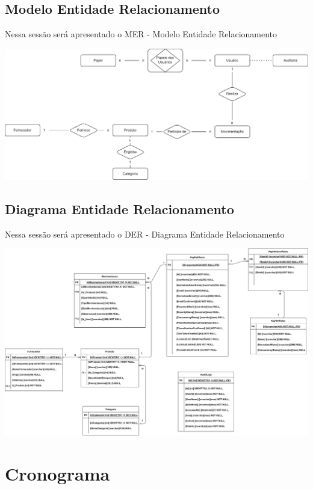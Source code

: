 \documentclass[
	12pt,				%
	openany,			%
	twoside,			%
	a4paper,			%
	english,			%
	brazil				%
	]{abntex2}
\begin{document}
\subsection{Modelo Entidade Relacionamento}
Nessa sessão será apresentado o MER - Modelo Entidade Relacionamento

\includegraphics[width=1.0\textwidth]{Figuras/MERestoque.png}


\subsection{Diagrama Entidade Relacionamento}
Nessa sessão será apresentado o DER - Diagrama Entidade Relacionamento

\includegraphics[width=1.0\textwidth]{Figuras/DERestoque.png}



\section{Cronograma}
\end{document}
